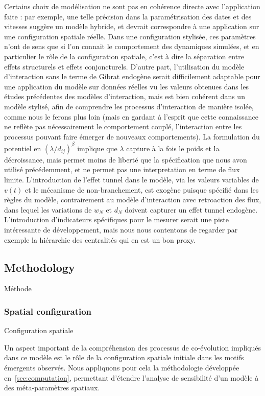 Certains choix de modélisation ne sont pas en cohérence directe avec l'application faite : par exemple, une telle précision dans la paramétrisation des dates et des vitesses suggère un modèle hybride, et devrait correspondre à une application sur une configuration spatiale réelle. Dans une configuration stylisée, ces paramètres n'ont de sens que si l'on connait le comportement des dynamiques simulées, et en particulier le rôle de la configuration spatiale, c'est à dire la séparation entre effets structurels et effets conjoncturels. D'autre part, l'utilisation du modèle d'interaction sans le terme de Gibrat endogène serait difficilement adaptable pour une application du modèle sur données réelles vu les valeurs obtenues dans les études précédentes des modèles d'interaction, mais est bien cohérent dans un modèle stylisé, afin de comprendre les processus d'interaction de manière isolée, comme nous le ferons plus loin (mais en gardant à l'esprit que cette connaissance ne reflète pas nécessairement le comportement couplé, l'interaction entre les processus pouvant faire émerger de nouveaux comportements). La formulation du potentiel en $(\lambda / d_{ij})^\beta$ implique que $\lambda$ capture à la fois le poids et la décroissance, mais permet moins de liberté que la spécification que nous avon utilisé précédemment, et ne permet pas une interpretation en terme de flux limite. L'introduction de l'effet tunnel dans le modèle, via les valeurs variables de $v(t)$ et le mécanisme de non-branchement, est exogène puisque spécifié dans les règles du modèle, contrairement au modèle d'interaction avec retroaction des flux, dans lequel les variations de $w_N$ et $d_N$ doivent capturer un effet tunnel endogène. L'introduction d'indicateurs spécifiques pour le mesurer serait une piste intéressante de développement, mais nous nous contentons de regarder par exemple la hiérarchie des centralités qui en est un bon proxy.



\subsection{Methodology}{Méthode}

\subsubsection{Spatial configuration}{Configuration spatiale}

Un aspect important de la compréhension des processus de co-évolution impliqués dans ce modèle est le rôle de la configuration spatiale initiale dans les motifs émergents observés. Nous appliquons pour cela la méthodologie développée en~\ref{sec:computation}, permettant d'étendre l'analyse de sensibilité d'un modèle à des méta-paramètres spatiaux.

